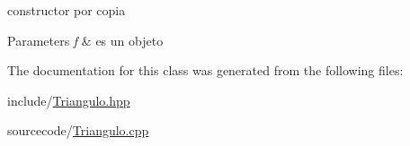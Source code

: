 constructor por copia 


\begin{DoxyParams}{Parameters}
{\em f} & es un objeto \\
\hline
\end{DoxyParams}


The documentation for this class was generated from the following files\+:\begin{DoxyCompactItemize}
\item 
include/\hyperlink{_triangulo_8hpp}{Triangulo.\+hpp}\item 
sourcecode/\hyperlink{_triangulo_8cpp}{Triangulo.\+cpp}\end{DoxyCompactItemize}
